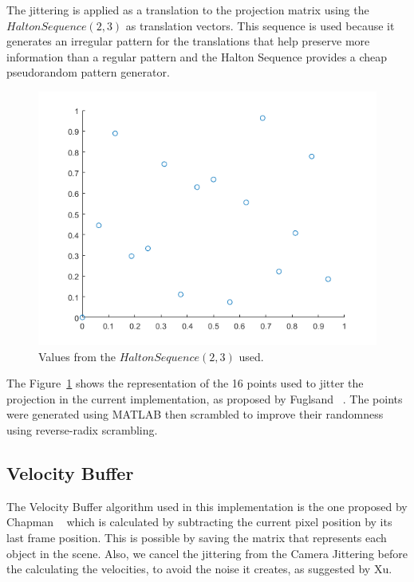 \documentclass{cslthse-msc}
\begin{document}
The jittering is applied as a translation to the projection matrix using the $Halton Sequence (2,3)$ as translation vectors. This sequence is used because it generates an irregular pattern for the translations that help preserve more information than a regular pattern and the Halton Sequence provides a cheap pseudorandom pattern generator. ~\cite{Fuglsand2016,XU2016} 

\begin{figure}[!hbt]
	\centering
	\includegraphics[scale=0.5]{images/halton_16.png}
	\caption{Values from the $Halton Sequence (2,3)$ used.}\label{fig:halton16}
\end{figure}

The Figure~\ref{fig:halton16} shows the representation of the 16 points used to jitter the projection in the current implementation, as proposed by Fuglsand ~\cite{Fuglsand2016}. The points were generated using MATLAB then scrambled to improve their randomness using reverse-radix scrambling.

\subsection{Velocity Buffer}
The Velocity Buffer algorithm used in this implementation is the one proposed by Chapman ~\cite{Chapman2012} which is calculated by subtracting the current pixel position by its last frame position. This is possible by saving the matrix that represents each object in the scene. Also, we cancel the jittering from the Camera Jittering before the calculating the velocities, to avoid the noise it creates, as suggested by Xu. ~\cite{XU2016}
\end{document}
